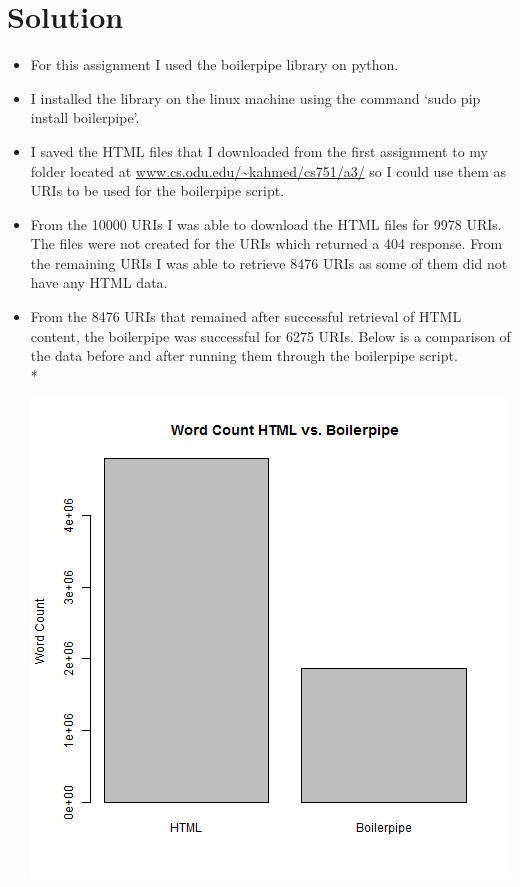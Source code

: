 \section{Solution}
\begin{itemize}
\item For this assignment I used the boilerpipe library on python.
\item I installed the library on the linux machine using the command `sudo pip install boilerpipe'.
\item I saved the HTML files that I downloaded from the first assignment to my folder located at \url{www.cs.odu.edu/~kahmed/cs751/a3/} so I could use them as URIs to be used for the boilerpipe script.
\item From the 10000 URIs I was able to download the HTML files for 9978 URIs. The files were not created for the URIs which returned a 404 response. From the remaining URIs I was able to retrieve 8476 URIs as some of them did not have any HTML data.
\item From the 8476 URIs that remained after successful retrieval of HTML content, the boilerpipe was successful for 6275 URIs. Below is a comparison of the data before and after running them through the boilerpipe script. \\*
	\begin{minipage}{\linewidth}
		\centering
			\includegraphics[scale=0.55]{figures/wordCount.png}

\end{minipage}
\end{itemize}
